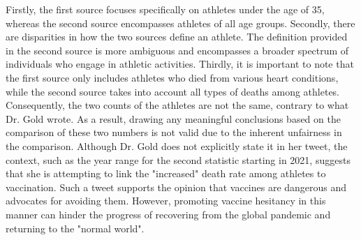 \documentclass[fleqn,12pt]{article}
\begin{document}
Firstly, the first source focuses specifically on athletes under the age of 35, whereas the second source encompasses athletes of all age groups. 
Secondly, there are disparities in how the two sources define an athlete. The definition provided in the second source is more ambiguous and encompasses a 
broader spectrum of individuals who engage in athletic activities. Thirdly, it is important to note that the first source only includes athletes who died from various heart conditions, while the second source takes into account all types of deaths among athletes. 
Consequently, the two counts of the athletes are not the same, contrary to what Dr. Gold wrote.
As a result, drawing any meaningful conclusions based on the comparison of these two numbers is not valid due to the inherent unfairness
in the comparison. Although Dr. Gold does not explicitly state it in her tweet, the context, such as the year range for the second statistic starting in 2021, 
suggests that she is attempting to link the "increased" death rate among athletes to vaccination.
Such a tweet supports the opinion that vaccines are dangerous and advocates for avoiding them. 
However, promoting vaccine hesitancy in this manner can hinder the progress of recovering from the global pandemic and returning to the "normal world".
\newpage
\end{document}
